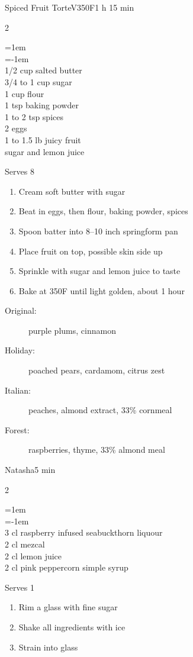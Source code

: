 \documentclass{article}
\newenvironment{recipe}[3][]
    {\begin{cardbase}[#1]{#2}{#3}
    \columnratio{0.333}
    \begin{paracol}{2}}
    {\end{paracol}\end{cardbase}}
\newenvironment{denserecipe}[3][]
    {\small
    \begin{recipe}[#1]{#2}{#3}}
    {\end{recipe}}
\newcommand{\nextcolumn}{\switchcolumn}
\newenvironment{ingredients}
    {
    \begin{obeylines}
    \vspace{\parskip}
    \setlength{\parskip}{0.25em}
    \vspace{-0.25em}
    \leftskip=1em
    \parindent=-1em}
    {\end{obeylines}}
\newenvironment{steps}
    {\begin{enumerate}[leftmargin=*,topsep=0pt]}
    {\end{enumerate}}
\newcommand{\fahrenheit}[1]{#1\textdegree{}F}
\newcommand{\tag}[1]{\hspace{1em}#1}
\newcommand{\symboltag}[2]{\tag{#1\hspace{0.4em}#2}}
\newcommand{\totaltime}[1]{\symboltag{\raisebox{-0.1em}{\small\StopWatchEnd}}{#1}}
\newcommand{\preheat}[1]{\symboltag{\Topbottomheat}{#1}}
\begin{document}
\begin{denserecipe}{Spiced Fruit Torte}{\tag{V}\preheat{\fahrenheit{350}}\totaltime{1 h 15 min}}
\begin{ingredients}
1/2 cup salted butter
3/4 to 1 cup sugar
1 cup flour
1 tsp baking powder
1 to 2 tsp spices
2 eggs
1 to 1.5 lb juicy fruit
sugar and lemon juice
\end{ingredients}
\nextcolumn
Serves 8
\begin{steps}
    \item Cream soft butter with sugar
    \item Beat in eggs, then flour, baking powder, spices
    \item Spoon batter into 8--10 inch springform pan
    \item Place fruit on top, possible skin side up
    \item Sprinkle with sugar and lemon juice to taste
    \item Bake at \fahrenheit{350} until light golden, about 1 hour
\end{steps}
\begin{description}
    \item[Original:] purple plums, cinnamon
    \item[Holiday:] poached pears, cardamom, citrus zest
    \item[Italian:] peaches, almond extract, 33\% cornmeal
    \item[Forest:] raspberries, thyme, 33\% almond meal
\end{description}
\end{denserecipe}

\begin{recipe}{Natasha}{\totaltime{5 min}}
\begin{ingredients}
3 cl raspberry infused seabuckthorn liquour
2 cl mezcal
2 cl lemon juice
2 cl pink peppercorn simple syrup
\end{ingredients}
\nextcolumn
Serves 1
\begin{steps}
    \item Rim a glass with fine sugar
    \item Shake all ingredients with ice
    \item Strain into glass
\end{steps}
\end{recipe}
\end{document}
